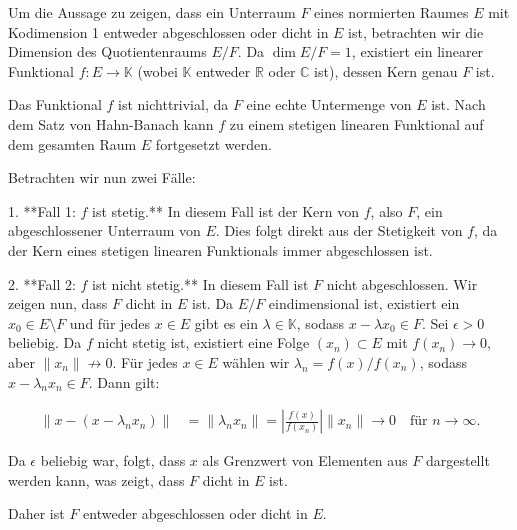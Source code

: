 Um die Aussage zu zeigen, dass ein Unterraum $F$ eines normierten Raumes $E$ mit Kodimension 1 entweder abgeschlossen oder dicht in $E$ ist, betrachten wir die Dimension des Quotientenraums $E/F$. Da $\operatorname{dim} E / F = 1$, existiert ein linearer Funktional $f: E \to \mathbb{K}$ (wobei $\mathbb{K}$ entweder $\mathbb{R}$ oder $\mathbb{C}$ ist), dessen Kern genau $F$ ist. 

Das Funktional $f$ ist nichttrivial, da $F$ eine echte Untermenge von $E$ ist. Nach dem Satz von Hahn-Banach kann $f$ zu einem stetigen linearen Funktional auf dem gesamten Raum $E$ fortgesetzt werden. 

Betrachten wir nun zwei Fälle:

1. **Fall 1: $f$ ist stetig.** In diesem Fall ist der Kern von $f$, also $F$, ein abgeschlossener Unterraum von $E$. Dies folgt direkt aus der Stetigkeit von $f$, da der Kern eines stetigen linearen Funktionals immer abgeschlossen ist.

2. **Fall 2: $f$ ist nicht stetig.** In diesem Fall ist $F$ nicht abgeschlossen. Wir zeigen nun, dass $F$ dicht in $E$ ist. Da $E/F$ eindimensional ist, existiert ein $x_0 \in E \setminus F$ und für jedes $x \in E$ gibt es ein $\lambda \in \mathbb{K}$, sodass $x - \lambda x_0 \in F$. Sei $\epsilon > 0$ beliebig. Da $f$ nicht stetig ist, existiert eine Folge $(x_n) \subset E$ mit $f(x_n) \to 0$, aber $\|x_n\| \not\to 0$. Für jedes $x \in E$ wählen wir $\lambda_n = f(x)/f(x_n)$, sodass $x - \lambda_n x_n \in F$. Dann gilt:

\begin{align*}
\|x - (x - \lambda_n x_n)\| &= \|\lambda_n x_n\| = \left|\frac{f(x)}{f(x_n)}\right| \|x_n\| \to 0 \quad \text{für } n \to \infty.
\end{align*}

Da $\epsilon$ beliebig war, folgt, dass $x$ als Grenzwert von Elementen aus $F$ dargestellt werden kann, was zeigt, dass $F$ dicht in $E$ ist.

Daher ist $F$ entweder abgeschlossen oder dicht in $E$.

